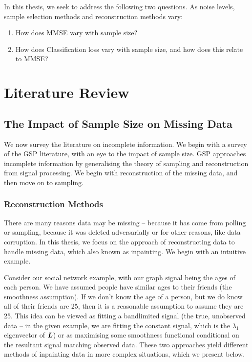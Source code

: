 In this thesis, we seek to address the following two questions. As noise levels, sample selection methods and reconstruction methods vary:
\begin{enumerate}
    \item How does MMSE vary with sample size?
    \item How does Classification loss vary with sample size, and how does this relate to MMSE?
\end{enumerate}

\section{Literature Review}
\label{sec:thesis_lit_review}

\subsection{The Impact of Sample Size on Missing Data}
We now survey the literature on incomplete information. We begin with a survey of the GSP literature, with an eye to the impact of sample size. GSP approaches incomplete information by generalising the theory of sampling and reconstruction from signal processing. We begin with reconstruction of the missing data, and then move on to sampling.

\subsubsection{Reconstruction Methods}
There are many reasons data may be missing -- because it has come from polling or sampling, because it was deleted adversarially or for other reasons, like data corruption. In this thesis, we focus on the approach of reconstructing data to handle missing data, which also known as inpainting. We begin with an intuitive example.

Consider our social network example, with our graph signal being the ages of each person. We have assumed people have similar ages to their friends (the smoothness assumption). If we don't know the age of a person, but we do know all of their friends are 25, then it is a reasonable assumption to assume they are 25. This idea can be viewed as fitting a bandlimited signal (the true, unobserved data -- in the given example, we are fitting the constant signal, which is the $\lambda_{1}$ eigenvector of $\bm{L}$) or as maximising some smoothness functional conditional on the resultant signal matching observed data. These two approaches yield different methods of inpainting data in more complex situations, which we present below.

